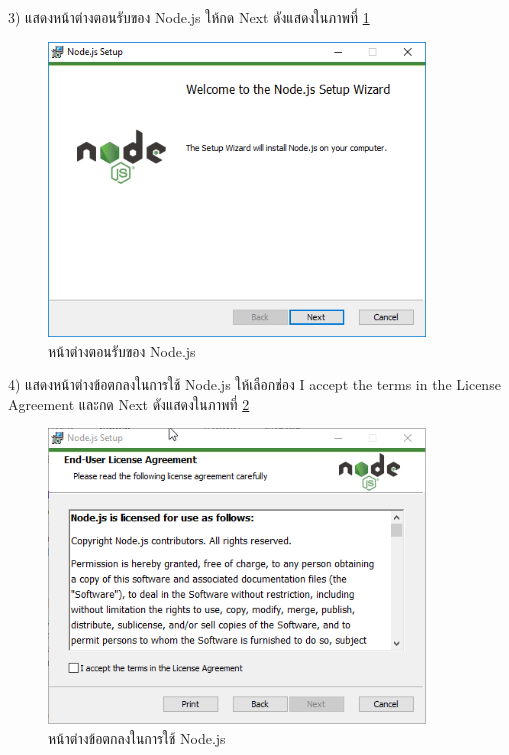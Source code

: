    3) แสดงหน้าต่างตอนรับของ Node.js ให้กด Next ดังแสดงในภาพที่ \ref{Fig:nodeInstall3}
      \begin{figure}[H]
            \centering
            \includegraphics[width=10cm]{Figures/7/3}
            \caption{หน้าต่างตอนรับของ Node.js}
            \label{Fig:nodeInstall3}
      \end{figure}

    4) แสดงหน้าต่างข้อตกลงในการใช้ Node.js ให้เลือกช่อง I accept the terms in the License Agreement และกด Next ดังแสดงในภาพที่ \ref{Fig:nodeInstall4}
      \begin{figure}[H]
            \centering
            \includegraphics[width=10cm]{Figures/7/4}
            \caption{หน้าต่างข้อตกลงในการใช้ Node.js}
            \label{Fig:nodeInstall4}
      \end{figure}

